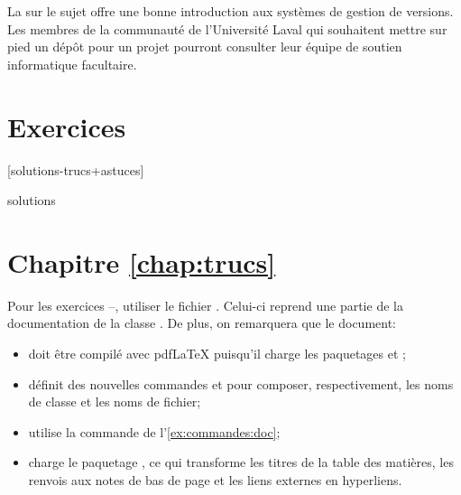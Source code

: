 La %
sur le sujet offre une bonne introduction aux systèmes de gestion de
versions. Les membres de la communauté de l'Université Laval qui
souhaitent mettre sur pied un dépôt pour un projet pourront
consulter leur équipe de soutien informatique facultaire.





\section{Exercices}
\label{sec:trucs:exercices}

[solutions-trucs+astuces]

\begin{Filesave}{solutions}
\section*{Chapitre \ref*{chap:trucs}}

\end{Filesave}

\noindent%
Pour les exercices
\nolink{\ref{exercice:trucs:1}}--\nolink{\ref{exercice:trucs:n}},
utiliser le fichier . Celui-ci reprend
une partie de la documentation de la classe . De plus,
on remarquera que le document:
\begin{itemize}
\item doit être compilé avec pdf{\LaTeX} puisqu'il charge les
  paquetages  et ;
\item définit des nouvelles commandes \cmdprint{\class} et
  \cmdprint{\fichier} pour composer, respectivement, les noms de
  classe et les noms de fichier;
\item utilise la commande \cmdprint{\doc} de
  l'\autoref{ex:commandes:doc};
\item charge le paquetage , ce qui transforme les titres
  de la table des matières, les renvois aux notes de bas de page et
  les liens externes en hyperliens.
\end{itemize}
\medskip


